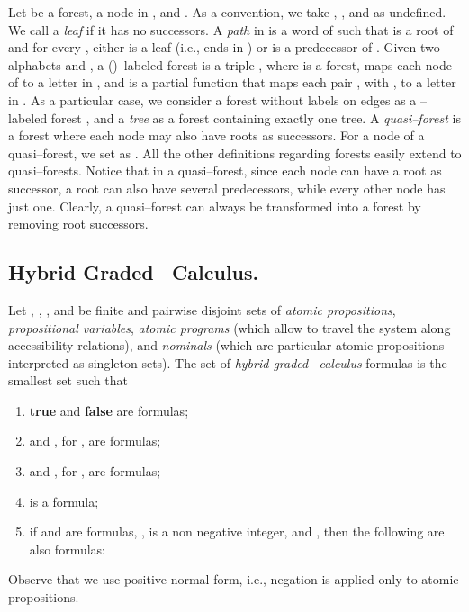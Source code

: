 \documentclass{LMCS}
\theoremstyle{plain}
\begin{document}
Let  be a forest,  a node in , and . As a convention, we take , , and  as undefined. We call  a \emph{leaf} if it has no
successors. A \emph{path}  in  is a word  of  such that  is a root of  and for every , either  is a leaf (i.e.,  ends in ) or
 is a predecessor of . Given two alphabets
 and , a ()--labeled forest
is a triple , where  is a forest,  maps each node of  to a letter in
, and  is a
partial function that maps each pair , with ,
to a letter in . As a particular case, we consider a
forest without labels on edges as a --labeled forest
, and a \emph{tree} as a forest containing exactly
one tree. A \emph{quasi--forest} is a forest where each node may
also have roots as successors. For a node  of a quasi--forest,
we set  as . All the other
definitions regarding forests easily extend to quasi--forests.
Notice that in a quasi--forest, since each node can have a root as
successor, a root can also have several predecessors, while every
other node has just one. Clearly, a quasi--forest can always be
transformed into a forest by removing root successors.

\subsection{Hybrid Graded --Calculus.}\label{sub:FullyEnrichedMuCalculus}
Let , , , and  be
finite and pairwise disjoint sets of \emph{atomic propositions},
\emph{propositional variables}, \emph{atomic programs} (which allow to travel
the system along accessibility relations), and \emph{nominals} (which are
particular atomic propositions interpreted as singleton sets). The set of
\emph{hybrid graded --calculus} formulas is the smallest set such that
\begin{enumerate}[]
\item
\textbf{true} and \textbf{false} are formulas;

\item
 and , for , are formulas;

\item
 and , for , are formulas;

\item
 is a formula;

\item
if  and  are formulas, ,  is a non
negative integer, and , then the following are also formulas:
    
\end{enumerate}

Observe that we use positive normal form, i.e., negation is applied only to
atomic propositions.
\end{document}
